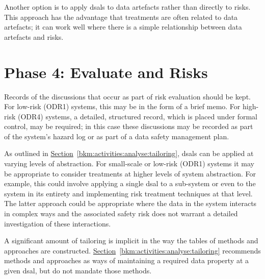 Another option is to apply \glspl{dsal} to \glspl{data artefact} rather than directly to risks. This approach has the advantage that \glspl{treatment} are often related to \glspl{data artefact}; it can work well where there is a simple relationship between \glspl{data artefact} and risks.

\section{Phase 4: Evaluate and  Risks}
Records of the discussions that occur as part of risk evaluation should be kept. For low-risk (ODR1) systems, this may be in the form of a brief memo. For high-risk (ODR4) systems, a detailed, structured record, which is placed under formal control, may be required; in this case these discussions may be recorded as part of the system's \gls{hazard log} or as part of a data safety management plan.

As outlined in
\hyperref[bkm:activities:analyse:tailoring]{Section}~\ref{bkm:activities:analyse:tailoring}, %
\glspl{dsal} can be applied at varying levels of abstraction. For small-scale or low-risk (ODR1) systems it may be appropriate to consider \glspl{treatment} at higher levels of system abstraction. For example, this could involve applying a single \gls{dsal} to a sub-system or even to the system in its entirety and implementing risk \gls{treatment} techniques at that level. The latter approach could be appropriate where the data in the system interacts in complex ways and the associated safety risk does not warrant a detailed investigation of these interactions.

A significant amount of \gls{tailoring} is implicit in the way the tables of methods and approaches are constructed. \hyperref[bkm:activities:analyse:tailoring]{Section}~\ref{bkm:activities:analyse:tailoring} recommends methods and approaches as ways of maintaining a required data property at a given \gls{dsal}, but do not mandate those methods.
